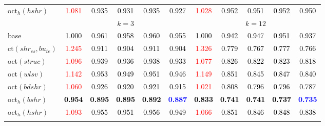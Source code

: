 \begin{tabular}[t]{l|>{}cccc>{}c|ccccc}
oct$_h(hshr)$ & \textcolor{red}{1.081} & \textcolor{black}{0.935} & \textcolor{black}{0.931} & \textcolor{black}{0.935} & \textcolor{black}{0.927} & \textcolor{red}{1.028} & \textcolor{black}{0.952} & \textcolor{black}{0.951} & \textcolor{black}{0.952} & \textcolor{black}{0.950}\\
\addlinespace[0.3em]
 &  & \\
base & \textcolor{black}{1.000} & \textcolor{black}{0.961} & \textcolor{black}{0.958} & \textcolor{black}{0.960} & \textcolor{black}{0.955} & \textcolor{black}{1.000} & \textcolor{black}{0.942} & \textcolor{black}{0.947} & \textcolor{black}{0.951} & \textcolor{black}{0.937}\\
ct$(shr_{cs}, bu_{te})$ & \textcolor{red}{1.245} & \textcolor{black}{0.911} & \textcolor{black}{0.904} & \textcolor{black}{0.911} & \textcolor{black}{0.904} & \textcolor{red}{1.326} & \textcolor{black}{0.779} & \textcolor{black}{0.767} & \textcolor{black}{0.777} & \textcolor{black}{0.766}\\
oct$(struc)$ & \textcolor{red}{1.096} & \textcolor{black}{0.939} & \textcolor{black}{0.936} & \textcolor{black}{0.938} & \textcolor{black}{0.933} & \textcolor{red}{1.077} & \textcolor{black}{0.826} & \textcolor{black}{0.822} & \textcolor{black}{0.823} & \textcolor{black}{0.818}\\
oct$(wlsv)$ & \textcolor{red}{1.142} & \textcolor{black}{0.953} & \textcolor{black}{0.949} & \textcolor{black}{0.951} & \textcolor{black}{0.946} & \textcolor{red}{1.149} & \textcolor{black}{0.851} & \textcolor{black}{0.845} & \textcolor{black}{0.847} & \textcolor{black}{0.840}\\
oct$(bdshr)$ & \textcolor{red}{1.060} & \textcolor{black}{0.926} & \textcolor{black}{0.920} & \textcolor{black}{0.921} & \textcolor{black}{0.915} & \textcolor{red}{1.021} & \textcolor{black}{0.808} & \textcolor{black}{0.796} & \textcolor{black}{0.796} & \textcolor{black}{0.787}\\
oct$_h(bshr)$ & \textcolor{black}{\textbf{0.954}} & \textcolor{black}{\textbf{0.895}} & \textcolor{black}{\textbf{0.895}} & \textcolor{black}{\textbf{0.892}} & \textcolor{blue}{\textbf{0.887}} & \textcolor{black}{\textbf{0.833}} & \textcolor{black}{\textbf{0.741}} & \textcolor{black}{\textbf{0.741}} & \textcolor{black}{\textbf{0.737}} & \textcolor{blue}{\textbf{0.735}}\\
oct$_h(hshr)$ & \textcolor{red}{1.093} & \textcolor{black}{0.955} & \textcolor{black}{0.951} & \textcolor{black}{0.956} & \textcolor{black}{0.949} & \textcolor{red}{1.066} & \textcolor{black}{0.851} & \textcolor{black}{0.846} & \textcolor{black}{0.848} & \textcolor{black}{0.838}\\
\bottomrule
{}\\
\end{tabular}
